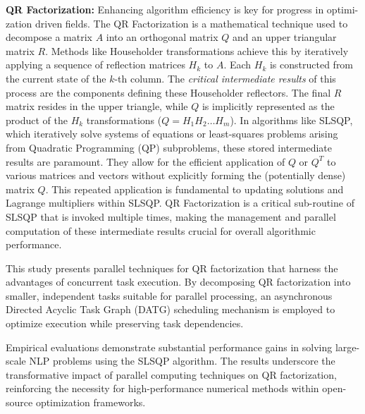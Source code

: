 \noindent
\textbf{QR Factorization:} Enhancing algorithm efficiency is key for progress in optimi-zation driven fields. The QR Factorization is a mathematical technique used to decompose a matrix \(A\) into an orthogonal matrix \(Q\) and an upper triangular matrix \(R\). Methods like Householder transformations achieve this by iteratively applying a sequence of reflection matrices \(H_k\) to \(A\). Each \(H_k\) is constructed from the current state of the \(k\)-th column. The \emph{critical intermediate results} of this process are the components defining these Householder reflectors. The final \(R\) matrix resides in the upper triangle, while \(Q\) is implicitly represented as the product of the \(H_k\) transformations (\(Q = H_1 H_2 \dots H_m\)). In algorithms like SLSQP, which iteratively solve systems of equations or least-squares problems arising from Quadratic Programming (QP) subproblems, these stored intermediate results are paramount. They allow for the efficient application of \(Q\) or \(Q^T\) to various matrices and vectors without explicitly forming the (potentially dense) matrix \(Q\). This repeated application is fundamental to updating solutions and Lagrange multipliers within SLSQP. QR Factorization is a critical sub-routine of SLSQP that is invoked multiple times, making the management and parallel computation of these intermediate results crucial for overall algorithmic performance.

This study presents parallel techniques for QR factorization that harness the advantages of concurrent task execution. By decomposing QR factorization into smaller, independent tasks suitable for parallel processing, an asynchronous Directed Acyclic Task Graph (DATG) scheduling mechanism is employed to optimize execution while preserving task dependencies.

Empirical evaluations demonstrate substantial performance gains in solving large-scale NLP problems using the SLSQP algorithm. The results underscore the transformative impact of parallel computing techniques on QR factorization, reinforcing the necessity for high-performance numerical methods within open-source optimization frameworks.


